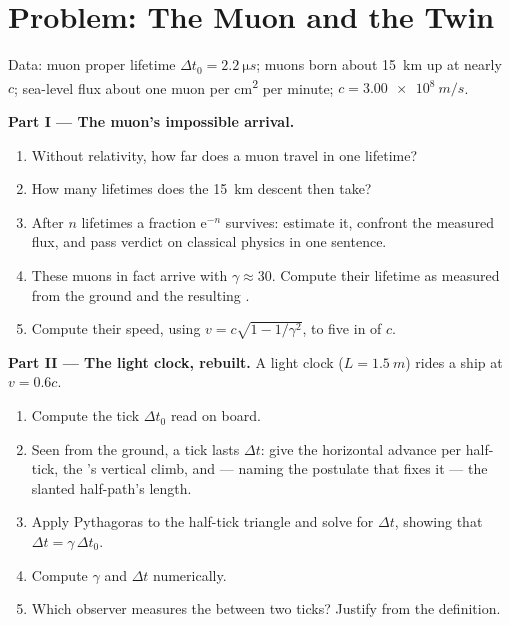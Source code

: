\section{Problem: The Muon and the Twin}

\begin{problem}
\label{pb:g12:special-relativity:1}
Data: muon proper lifetime $\Delta t_0 = \qty{2.2}{\micro s}$; muons born
about \qty{15}{km} up at nearly $c$; sea-level flux about one muon per
\unit{cm^2} per minute; $c = \qty{3.00e8}{m/s}$.

\medskip
\noindent\textbf{Part I --- The muon's impossible arrival.}
\begin{enumerate}
  \item Without relativity, how far does a muon travel in one lifetime?
  \item How many lifetimes does the \qty{15}{km} descent then take?
  \item After $n$ lifetimes a fraction $\mathrm{e}^{-n}$ survives:
        estimate it, confront the measured flux, and pass verdict on
        classical physics in one sentence.
  \item These muons in fact arrive with $\gamma \approx 30$. Compute their
        lifetime as measured from the ground and the resulting .
  \item Compute their speed, using $v = c\sqrt{1 - 1/\gamma^2}$, to five
         in  of $c$.
\end{enumerate}

\medskip
\noindent\textbf{Part II --- The light clock, rebuilt.}
A light clock ($L = \qty{1.5}{m}$) rides a ship at $v = 0.6c$.
\begin{enumerate}[resume]
  \item Compute the tick $\Delta t_0$ read on board.
  \item Seen from the ground, a tick lasts $\Delta t$: give the horizontal
        advance per half-tick, the 's vertical climb, and --- naming
        the postulate that fixes it --- the slanted half-path's length.
  \item Apply Pythagoras to the half-tick triangle and solve for
        $\Delta t$, showing that $\Delta t = \gamma\,\Delta t_0$.
  \item Compute $\gamma$ and $\Delta t$ numerically.
  \item Which observer measures the  between two ticks? Justify
        from the definition.
\end{enumerate}


\end{problem}
